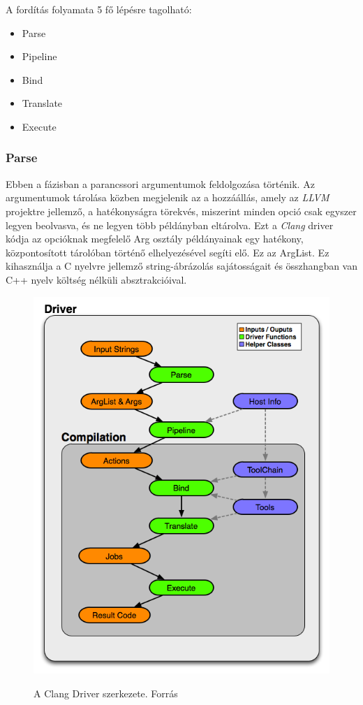 \documentclass[a4paper,12pt]{report}
\begin{document}
A fordítás folyamata 5 fő lépésre tagolható:
\begin{itemize}
\item Parse
\item Pipeline
\item Bind
\item Translate
\item Execute
\end{itemize}

\subsubsection{Parse}
Ebben a fázisban a parancssori argumentumok feldolgozása történik. Az argumentumok tárolása közben megjelenik az a hozzáállás, amely az \emph{LLVM} projektre jellemző, a hatékonyságra törekvés, miszerint minden opció csak egyszer legyen beolvasva, és ne legyen több példányban eltárolva. Ezt a \emph{Clang} driver kódja az opcióknak megfelelő Arg osztály példányainak egy hatékony, központosított tárolóban történő elhelyezésével segíti elő. Ez az ArgList. Ez kihasználja a C nyelvre jellemző string-ábrázolás sajátosságait és  összhangban van C++ nyelv költség nélküli absztrakcióival.

\begin{figure}[h]
\caption{A Clang Driver szerkezete. Forrás \cite{clangdriverimage}}
\centering
\includegraphics[scale=0.6]{DriverArchitecture.png}
\label{fig:clangdriver}
\end{figure}
\end{document}
